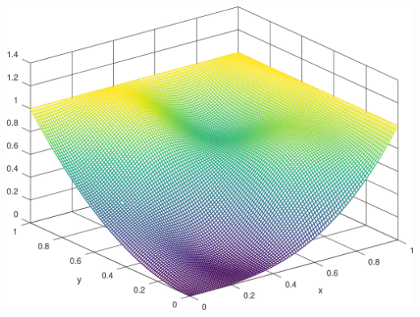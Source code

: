 \begin{center}
  \includegraphics[width = \textwidth]{chapter_08/exercise_08_42_figure_2.pdf}
\end{center}
